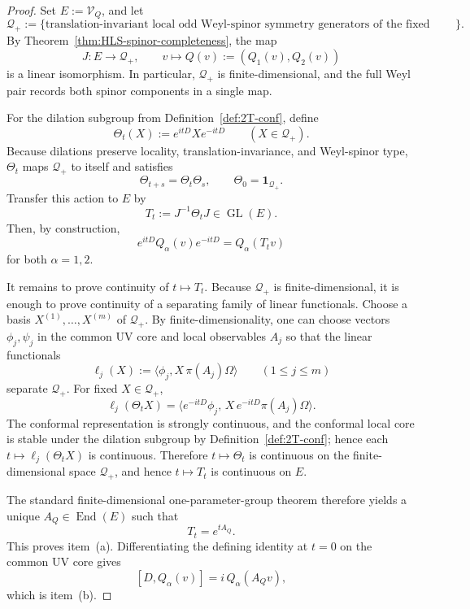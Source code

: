 \begin{proof}
Set \(E:=\mathcal V_Q\), and let
\[
\mathscr Q_+
:=
\{\text{translation-invariant local odd Weyl-spinor symmetry generators of the fixed chirality}\}.
\]
By Theorem~\ref{thm:HLS-spinor-completeness}, the map
\[
J:E\longrightarrow \mathscr Q_+,
\qquad
v\longmapsto Q(v):=(Q_1(v),Q_2(v))
\]
is a linear isomorphism. In particular, \(\mathscr Q_+\) is finite-dimensional,
and the full Weyl pair records both spinor components in a single map.

For the dilation subgroup from Definition~\ref{def:2T-conf}, define
\[
\Theta_t(X):=e^{itD}Xe^{-itD}
\qquad(X\in\mathscr Q_+).
\]
Because dilations preserve locality, translation-invariance, and Weyl-spinor
type, \(\Theta_t\) maps \(\mathscr Q_+\) to itself and satisfies
\[
\Theta_{t+s}=\Theta_t\Theta_s,
\qquad
\Theta_0=\mathbf 1_{\mathscr Q_+}.
\]
Transfer this action to \(E\) by
\[
T_t:=J^{-1}\Theta_tJ\in\operatorname{GL}(E).
\]
Then, by construction,
\[
e^{itD}Q_\alpha(v)e^{-itD}=Q_\alpha(T_tv)
\]
for both \(\alpha=1,2\).

It remains to prove continuity of \(t\mapsto T_t\). Because \(\mathscr Q_+\) is
finite-dimensional, it is enough to prove continuity of a separating family of
linear functionals. Choose a basis \(X^{(1)},\dots,X^{(m)}\) of \(\mathscr Q_+\).
By finite-dimensionality, one can choose vectors \(\phi_j,\psi_j\) in the common
UV core and local observables \(A_j\) so that the linear functionals
\[
\ell_j(X):=\langle\phi_j,X\,\pi(A_j)\Omega\rangle
\qquad(1\le j\le m)
\]
separate \(\mathscr Q_+\). For fixed \(X\in\mathscr Q_+\),
\[
\ell_j(\Theta_tX)
=
\big\langle e^{-itD}\phi_j,\,
X\,e^{-itD}\pi(A_j)\Omega\big\rangle.
\]
The conformal representation is strongly continuous, and the conformal local core
is stable under the dilation subgroup by Definition~\ref{def:2T-conf}; hence each
\(t\mapsto \ell_j(\Theta_tX)\) is continuous. Therefore \(t\mapsto\Theta_t\) is
continuous on the finite-dimensional space \(\mathscr Q_+\), and hence
\(t\mapsto T_t\) is continuous on \(E\).

The standard finite-dimensional one-parameter-group theorem therefore yields a
unique \(A_Q\in\operatorname{End}(E)\) such that
\[
T_t=e^{tA_Q}.
\]
This proves item~\textnormal{(a)}. Differentiating the defining identity at
\(t=0\) on the common UV core gives
\[
[D,Q_\alpha(v)] = i\,Q_\alpha(A_Qv),
\]
which is item~\textnormal{(b)}.


\end{proof}

